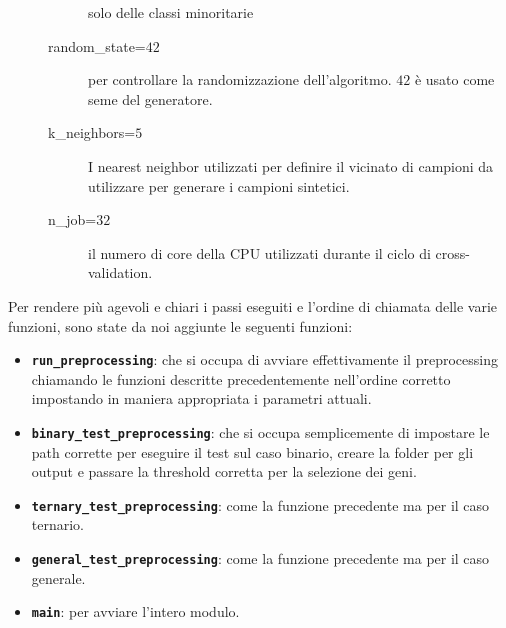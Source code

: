 \begin{description}
\begin{description}
                                       solo delle classi minoritarie
                                       \item[random\_state=$42$] per controllare la randomizzazione dell'algoritmo. 
                                                                 $42$ è usato come seme del generatore.
                                       \item[k\_neighbors=$5$] I nearest neighbor utilizzati per definire il vicinato di
                                                               campioni da utilizzare per generare i campioni sintetici. 
                                       \item[n\_job=$32$] il numero di core della CPU utilizzati durante il ciclo di
                                                          cross-validation.
                                   \end{description}
\end{description}  

Per rendere più agevoli e chiari i passi eseguiti e l'ordine di chiamata delle varie funzioni, sono state da 
noi aggiunte le seguenti funzioni:
\begin{itemize}
    \item \textbf{\texttt{run\_preprocessing}}: che si occupa di avviare effettivamente il preprocessing 
           chiamando le funzioni descritte precedentemente nell'ordine corretto impostando in maniera appropriata 
           i parametri attuali.
    \item \textbf{\texttt{binary\_test\_preprocessing}}: che si occupa semplicemente di impostare le path corrette 
           per eseguire il test sul caso binario, creare la folder per gli output e passare la threshold corretta 
           per la selezione dei geni.
    \item \textbf{\texttt{ternary\_test\_preprocessing}}: come la funzione precedente ma per il caso ternario.
    \item \textbf{\texttt{general\_test\_preprocessing}}: come la funzione precedente ma per il caso generale.
    \item \textbf{\texttt{main}}: per avviare l'intero modulo.
\end{itemize}

